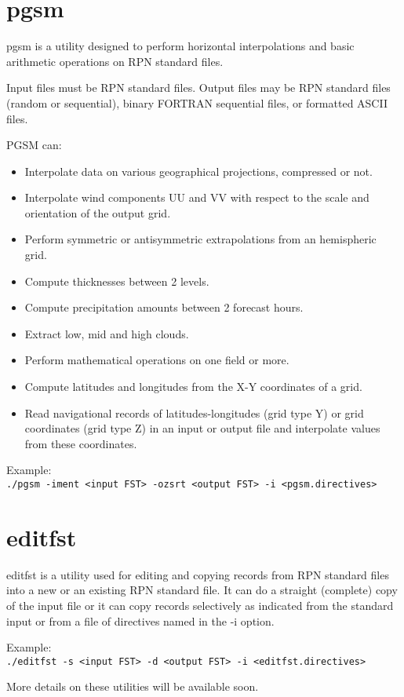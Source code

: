 \documentclass[11pt]{book}
\begin{document}
\section{pgsm}

pgsm is a utility designed to perform horizontal interpolations and basic
arithmetic operations on RPN standard files.

Input files must be RPN standard files. Output files may be RPN standard
files (random or sequential), binary FORTRAN sequential files, or formatted
ASCII files.

PGSM can:
\begin{itemize}
\item Interpolate data on various geographical projections, compressed or not.
\item Interpolate wind components UU and VV with respect to the scale and orientation of the output grid.
\item Perform symmetric or antisymmetric extrapolations from an hemispheric grid.
\item Compute thicknesses between 2 levels.
\item Compute precipitation amounts between 2 forecast hours.
\item Extract low, mid and high clouds.
\item Perform mathematical operations on one field or more.
\item Compute latitudes and longitudes from the X-Y coordinates of a grid.
\item Read navigational records of latitudes-longitudes (grid type Y) or
  grid coordinates (grid type Z) in an input or output file and interpolate
  values from these coordinates.
\end{itemize}

Example:\\
\texttt{./pgsm -iment <input FST> -ozsrt <output FST> -i <pgsm.directives>}

\section{editfst}

editfst is a utility used for editing and copying records from RPN standard
files into a new or an existing RPN standard file. It can do a straight
(complete) copy of the input file or it can copy records selectively as
indicated from the standard input or from a file of directives named in the
-i option.

Example:\\
\texttt{./editfst -s <input FST> -d <output FST> -i <editfst.directives>}

More details on these utilities will be available soon.
\end{document}
